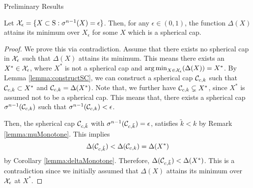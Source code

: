 \begin{subsection}{Preliminary Results}
\begin{lemma}\label{thm:mainSphericalCap}Let $\mathcal{X}_{\epsilon} = \{X \subset \text{S}: \sigma^{n-1}(X) = \epsilon\}$. Then, for any $\epsilon \in (0,1)$, the function $\Delta(X)$ attains its minimum over $X_{\epsilon}$ for some $X$ which is a spherical cap.
\end{lemma}

\begin{proof}We prove this via contradiction. Assume that there exists no spherical cap in $\mathcal{X}_{\epsilon}$ such that $\Delta(X)$ attains its minimum. This means there exists an $X^* \in \mathcal{X}_{\epsilon}$, where $X^*$ is not a spherical cap and $\operatorname*{arg\,min}_{X \in \mathcal{X}_{\epsilon}}(\Delta(X))=X^*$. By Lemma \ref{lemma:constructSC}, we can construct a spherical cap $\mathcal{C}_{c,k}$ such that $\mathcal{C}_{c,k} \subset X^*$ and $\mathcal{C}_{c,k} = \Delta(X^*)$. Note that, we further have $\mathcal{C}_{c,k} \subsetneq X^*$, since $X^*$ is assumed not to be a spherical cap. This means that, there exists a spherical cap $\sigma^{n-1}(\mathcal{C}_{c,k})$ such that $\sigma^{n-1}(\mathcal{C}_{c,k}) < \epsilon$. 

Then, the spherical cap $\mathcal{C}_{c, \tilde{k}}$ with $\sigma^{n-1}(\mathcal{C}_{c, \tilde{k}}) = \epsilon$, satisfies $\tilde{k} < k$ by Remark \ref{lemma:muMonotone}. This implies $$\Delta(\mathcal{C}_{c, \tilde{k}}) < \Delta(\mathcal{C}_{c, k}) = \Delta(X^*)$$ by Corollary \ref{lemma:deltaMonotone}. Therefore, $\Delta(\mathcal{C}_{c, \tilde{k}}) < \Delta(X^*)$. This is a contradiction since we initially assumed that $\Delta(X)$ attains its minimum over $\mathcal{X}_{\epsilon}$ at $X^*$.
\end{proof}
\end{subsection}

